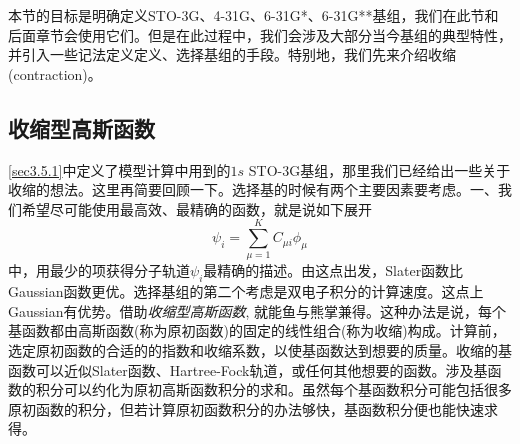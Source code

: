本节的目标是明确定义STO-3G、4-31G、6-31G*、6-31G**基组，我们在此节和后面章节会使用它们。但是在此过程中，我们会涉及大部分当今基组的典型特性，并引入一些记法定义定义、选择基组的手段。特别地，我们先来介绍收缩(contraction)。
\subsection{收缩型高斯函数}
\ref{sec3.5.1}中定义了模型计算中用到的$1s$ STO-3G基组，那里我们已经给出一些关于收缩的想法。这里再简要回顾一下。选择基的时候有两个主要因素要考虑。一、我们希望尽可能使用最高效、最精确的函数，就是说如下展开
\begin{equation}
\psi_i=\sum_{\mu=1}^{K}C_{\mu i}\phi_\mu
\end{equation}
中，用最少的项获得分子轨道$\psi_i$最精确的描述。由这点出发，Slater函数比Gaussian函数更优。选择基组的第二个考虑是双电子积分的计算速度。这点上Gaussian有优势。借助\emph{收缩型高斯函数}, 就能鱼与熊掌兼得。这种办法是说，每个基函数都由高斯函数(称为原初函数)的固定的线性组合(称为收缩)构成。计算前，选定原初函数的合适的的指数和收缩系数，以使基函数达到想要的质量。收缩的基函数可以近似Slater函数、Hartree-Fock轨道，或任何其他想要的函数。涉及基函数的积分可以约化为原初高斯函数积分的求和。虽然每个基函数积分可能包括很多原初函数的积分，但若计算原初函数积分的办法够快，基函数积分便也能快速求得。

